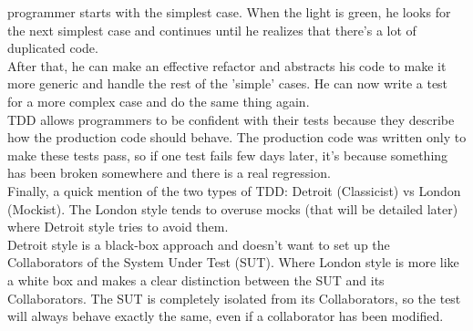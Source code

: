 programmer starts with the simplest case.
When the light is green, he looks for the next simplest case and
continues until he realizes that there's a lot of duplicated code. \\
After that, he can make an effective refactor and abstracts his code to
make it more generic and handle the rest of the 'simple' cases.
He can now write a test for a more complex case and do the same thing
again. \\
\newline
TDD allows programmers to be confident with their tests because they
describe how the production code should behave.
The production code was written only to make these tests pass, so if
one test fails few days later, it's because something has been broken
somewhere and there is a real regression. \\
\newline
Finally, a quick mention of the two types of TDD: Detroit (Classicist)
vs London (Mockist).
The London style tends to overuse mocks (that will be detailed later)
where Detroit style tries to avoid them. \\
Detroit style is a black-box approach and doesn't want to set up the
Collaborators of the System Under Test (SUT).
Where London style is more like a white box and makes a clear distinction
between the SUT and its Collaborators.
The SUT is completely isolated from its Collaborators, so the test will
always behave exactly the same, even if a collaborator has been modified.

